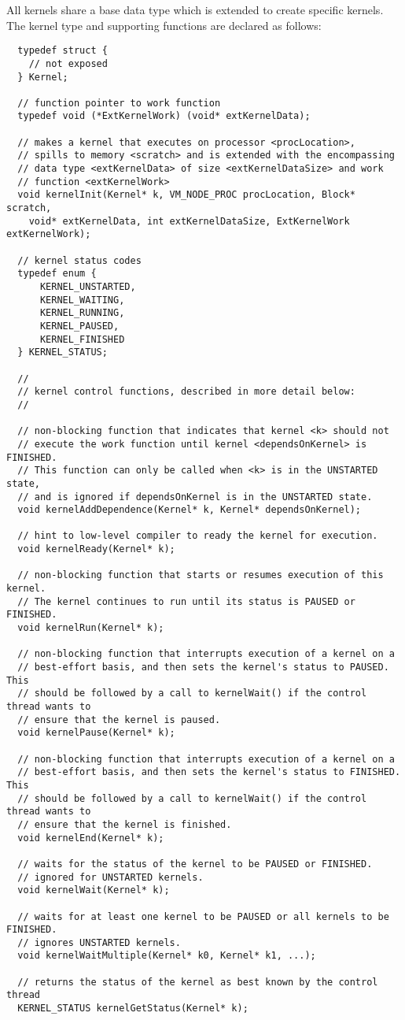 
All kernels share a base data type which is extended to create
specific kernels. The kernel type and supporting functions are
declared as follows:

{\small
\begin{verbatim}
  typedef struct {
    // not exposed
  } Kernel;

  // function pointer to work function
  typedef void (*ExtKernelWork) (void* extKernelData);

  // makes a kernel that executes on processor <procLocation>,
  // spills to memory <scratch> and is extended with the encompassing
  // data type <extKernelData> of size <extKernelDataSize> and work
  // function <extKernelWork>
  void kernelInit(Kernel* k, VM_NODE_PROC procLocation, Block* scratch,
    void* extKernelData, int extKernelDataSize, ExtKernelWork extKernelWork);

  // kernel status codes
  typedef enum {
      KERNEL_UNSTARTED,
      KERNEL_WAITING,
      KERNEL_RUNNING,
      KERNEL_PAUSED,
      KERNEL_FINISHED
  } KERNEL_STATUS;

  //
  // kernel control functions, described in more detail below:
  //

  // non-blocking function that indicates that kernel <k> should not 
  // execute the work function until kernel <dependsOnKernel> is FINISHED.  
  // This function can only be called when <k> is in the UNSTARTED state,
  // and is ignored if dependsOnKernel is in the UNSTARTED state.
  void kernelAddDependence(Kernel* k, Kernel* dependsOnKernel);

  // hint to low-level compiler to ready the kernel for execution.
  void kernelReady(Kernel* k);

  // non-blocking function that starts or resumes execution of this kernel. 
  // The kernel continues to run until its status is PAUSED or FINISHED.
  void kernelRun(Kernel* k);

  // non-blocking function that interrupts execution of a kernel on a
  // best-effort basis, and then sets the kernel's status to PAUSED.  This 
  // should be followed by a call to kernelWait() if the control thread wants to
  // ensure that the kernel is paused.
  void kernelPause(Kernel* k);

  // non-blocking function that interrupts execution of a kernel on a 
  // best-effort basis, and then sets the kernel's status to FINISHED.  This 
  // should be followed by a call to kernelWait() if the control thread wants to
  // ensure that the kernel is finished.
  void kernelEnd(Kernel* k);

  // waits for the status of the kernel to be PAUSED or FINISHED.
  // ignored for UNSTARTED kernels.
  void kernelWait(Kernel* k);

  // waits for at least one kernel to be PAUSED or all kernels to be FINISHED.
  // ignores UNSTARTED kernels.
  void kernelWaitMultiple(Kernel* k0, Kernel* k1, ...);

  // returns the status of the kernel as best known by the control thread
  KERNEL_STATUS kernelGetStatus(Kernel* k);
\end{verbatim}}

